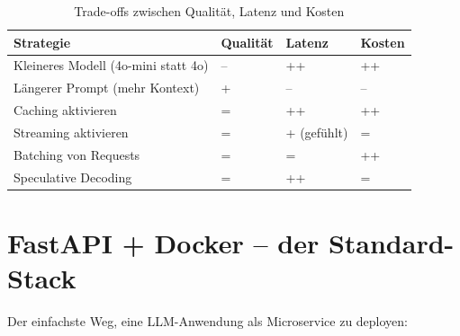 \begin{table}[H]
\centering
\begin{tabularx}{\linewidth}{XXXX}
\toprule
\textbf{Strategie} & \textbf{Qualität} & \textbf{Latenz} & \textbf{Kosten} \\
\midrule
Kleineres Modell (4o-mini statt 4o) & -- & ++ & ++ \\
Längerer Prompt (mehr Kontext) & + & -- & -- \\
Caching aktivieren & = & ++ & ++ \\
Streaming aktivieren & = & + (gefühlt) & = \\
Batching von Requests & = & = & ++ \\
Speculative Decoding & = & ++ & = \\
\bottomrule
\end{tabularx}
\caption{Trade-offs zwischen Qualität, Latenz und Kosten}
\end{table}

\section{FastAPI + Docker -- der Standard-Stack}

Der einfachste Weg, eine LLM-Anwendung als Microservice zu deployen:

